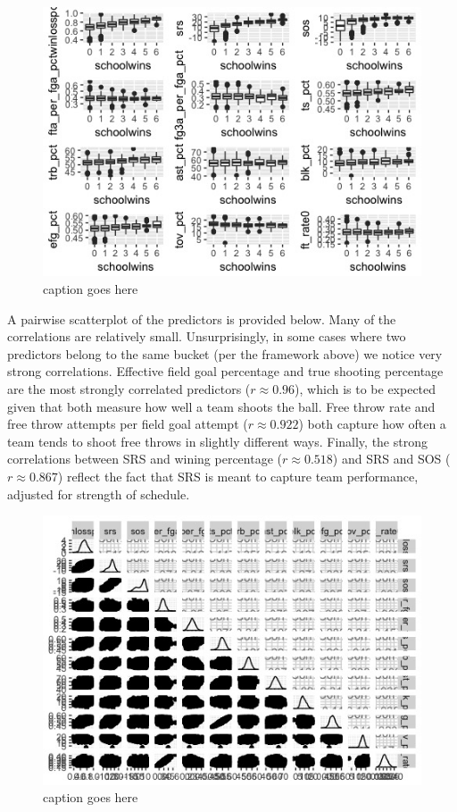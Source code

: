 \documentclass[10pt,a4paper, hidelinks]{article} %
\begin{document}
\begin{figure}[H]
	\centering
	\includegraphics[width=0.7\linewidth]{../fig/RayleighWetDream}
	\caption{caption goes here}
	\label{fig:rayleighwetdream}
\end{figure}


A pairwise scatterplot of the predictors is provided below. Many of the correlations are relatively small. Unsurprisingly, in some cases where two predictors belong to the same bucket (per the framework above) we notice very strong correlations. Effective field goal percentage and true shooting percentage are the most strongly correlated predictors ($r \approx 0.96$), which is to be expected given that both measure how well a team shoots the ball. Free throw rate and free throw attempts per field goal attempt ($r \approx 0.922$) both capture how often a team tends to shoot free throws in slightly different ways. Finally, the strong correlations between SRS and wining percentage ($r \approx 0.518$) and SRS and SOS ($r \approx 0.867$) reflect the fact that SRS is meant to capture team performance, adjusted for strength of schedule.

\begin{figure}[H]
	\centering
	\includegraphics[width=0.7\linewidth]{../fig/MoneyMaker}
	\caption{caption goes here}
	\label{fig:ggpairs}
\end{figure} 
\end{document}
